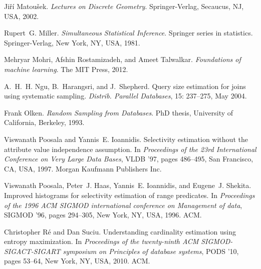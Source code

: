 \begin{thebibliography}{67}
Ji\v{r}\'{i} Matou\v{s}ek.
\newblock \emph{Lectures on Discrete Geometry}.
\newblock Springer-Verlag, Secaucus, NJ, USA, 2002.

Rupert~G. Miller.
\newblock \emph{Simultaneous Statistical Inference}.
\newblock Springer series in statistics. Springer-Verlag, New York, NY, USA,
  1981.

Mehryar Mohri, Afshin Rostamizadeh, and Ameet Talwalkar.
\newblock \emph{Foundations of machine learning}.
\newblock The MIT Press, 2012.

A.~H.~H. Ngu, B.~Harangsri, and J.~Shepherd.
\newblock Query size estimation for joins using systematic sampling.
\newblock \emph{Distrib. Parallel Databases}, 15: 237--275, May 2004.

Frank Olken.
\newblock \emph{Random Sampling from Databases}.
\newblock PhD thesis, University of California, Berkeley, 1993.

Viswanath Poosala and Yannis~E. Ioannidis.
\newblock Selectivity estimation without the attribute value independence
  assumption.
\newblock In \emph{Proceedings of the 23rd International Conference on Very
  Large Data Bases}, VLDB '97, pages 486--495, San Francisco, CA, USA, 1997.
  Morgan Kaufmann Publishers Inc.

Viswanath Poosala, Peter~J. Haas, Yannis~E. Ioannidis, and Eugene~J. Shekita.
\newblock Improved histograms for selectivity estimation of range predicates.
\newblock In \emph{Proceedings of the 1996 ACM SIGMOD international conference
  on Management of data}, SIGMOD '96, pages 294--305, New York, NY, USA, 1996.
  ACM.

Christopher R\'{e} and Dan Suciu.
\newblock Understanding cardinality estimation using entropy maximization.
\newblock In \emph{Proceedings of the twenty-ninth ACM SIGMOD-SIGACT-SIGART
  symposium on Principles of database systems}, PODS '10, pages 53--64, New
  York, NY, USA, 2010. ACM.


\end{thebibliography}
